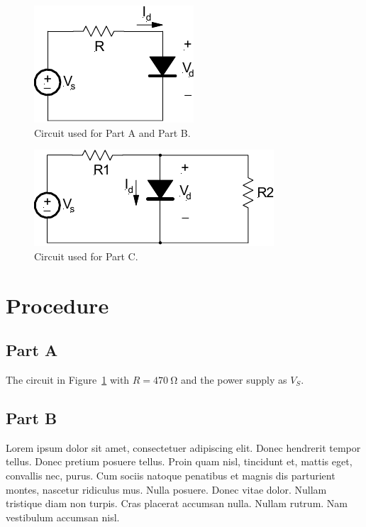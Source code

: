 \documentclass{article}
\begin{document}
\begin{figure}[hbtp]
  \centering
  \includegraphics[]{img/circuit1}
  \caption{\label{fig:circuit1} Circuit used for Part A and Part B.}
\end{figure}

\begin{figure}[hbtp]
  \centering
  \includegraphics[]{img/circuit2}
  \caption{\label{fig:circuit2} Circuit used for Part C.}
\end{figure}

\section{Procedure}
\label{sec:procedure}

\subsection{Part A}
\label{sec:proc_a}

The circuit in Figure~\ref{fig:circuit1} with $R = \SI{470}{\ohm}$ and
the power supply as $V_S$.

\subsection{Part B}
\label{sec:proc_b}

Lorem ipsum dolor sit amet, consectetuer adipiscing elit. Donec
hendrerit tempor tellus. Donec pretium posuere tellus. Proin quam
nisl, tincidunt et, mattis eget, convallis nec, purus. Cum sociis
natoque penatibus et magnis dis parturient montes, nascetur ridiculus
mus. Nulla posuere. Donec vitae dolor. Nullam tristique diam non
turpis. Cras placerat accumsan nulla. Nullam rutrum. Nam vestibulum
accumsan nisl.
\end{document}

